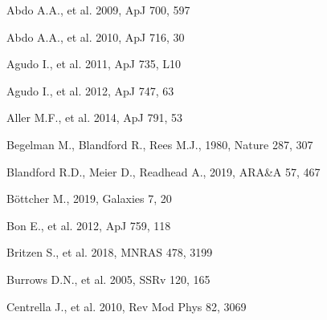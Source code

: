 \documentclass[preprints,article,accept,moreauthors,pdftex]{Definitions/mdpi}
\begin{document}
%

\begin{thebibliography}{999}

Abdo A.A., et al. 2009, ApJ 700, 597

Abdo A.A., et al. 2010, ApJ 716, 30

Agudo I., et al. 2011, ApJ 735, L10

Agudo I., et al. 2012, ApJ 747, 63

Aller M.F., et al. 2014, ApJ 791, 53

Begelman M., Blandford R., Rees M.J., 1980, Nature 287, 307

Blandford R.D., Meier D., Readhead A., 2019, ARA\&A 57, 467 

B\"ottcher M., 2019, Galaxies 7, 20

Bon E., et al. 2012, ApJ 759, 118


Britzen S., et al. 2018, MNRAS 478, 3199

Burrows D.N., et al. 2005, SSRv 120, 165

Centrella J., et al. 2010, Rev Mod Phys 82, 3069


\end{thebibliography}
\end{document}
